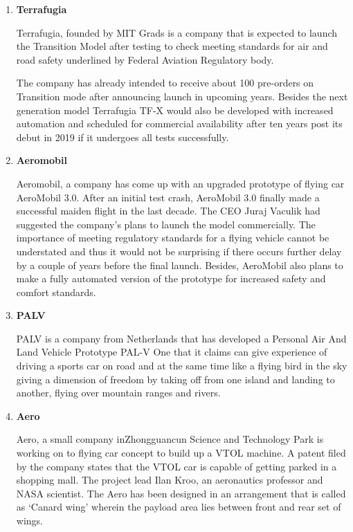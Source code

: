 \begin{enumerate}

\item \textbf{Terrafugia}

Terrafugia, founded by MIT Grads is a company that is expected to launch the Transition Model after testing to check meeting standards for air and road safety underlined by Federal Aviation Regulatory body.

The company has already intended to receive about 100 pre-orders on Transition mode after announcing launch in upcoming years. Besides the next generation model Terrafugia TF-X would also be developed with increased automation and scheduled for commercial availability after ten years post its debut in 2019 if it undergoes all tests successfully.

\item \textbf{Aeromobil}

Aeromobil, a company has come up with an upgraded prototype of flying car AeroMobil 3.0. After an initial test crash, AeroMobil 3.0 finally made a successful maiden flight in the last decade. The CEO Juraj Vaculik had suggested the company’s plans to launch the model commercially. The importance of meeting regulatory standards for a flying vehicle cannot be understated and thus it would not be surprising if there occurs further delay by a couple of years before the final launch. Besides, AeroMobil also plans to make a fully automated version of the prototype for increased safety and comfort standards.

\item \textbf{PALV}

PALV is a company from Netherlands that has developed a Personal Air And Land Vehicle Prototype PAL-V One that it claims can give experience of driving a sports car on road and at the same time like a flying bird in the sky giving a dimension of freedom by taking off from one island and landing to another, flying over  mountain ranges and rivers.

\item \textbf{Aero}

Aero, a small company inZhongguancun Science and Technology Park is working on to flying car concept to build up a VTOL machine. A patent filed by the company states that the VTOL car is capable of getting parked in a shopping mall. The project lead Ilan Kroo, an aeronautics professor and NASA scientist. The Aero has been designed in an arrangement that is called as ‘Canard wing’ wherein the payload area lies between front and rear set of wings.

\end{enumerate}

